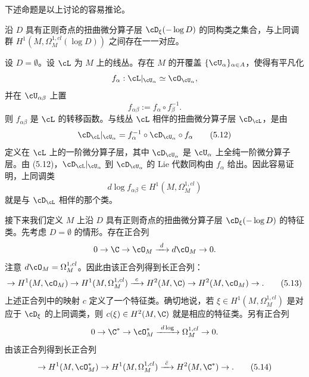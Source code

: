 下述命题是以上讨论的容易推论。

\begin{proposition}[5.9]
 沿 $D$ 具有正则奇点的扭曲微分算子层 $\cD_\xi(-\log D)$ 的同构类之集合，与上同调群 $H^1(M,\Omega^{1,cl}_M(\log D))$ 之间存在一一对应。
\end{proposition}


\begin{example}[5.10]
 设 $D=\emptyset$。设 $\cL$ 为 $M$ 上的线丛。存在 $M$ 的开覆盖 $\{\cU_\alpha\}_{\alpha\in A}$，使得有平凡化
 \[
  f_\alpha:\cL|_{\cU_\alpha}\simeq\cO_{\cU_\alpha},
 \]
 并在 $\cU_{\alpha\beta}$ 上置
 \[
  f_{\alpha\beta}:=f_\alpha\circ f_\beta^{-1}.
 \]
 则 $f_{\alpha\beta}$ 是 $\cL$ 的转移函数。与线丛 $\cL$ 相伴的扭曲微分算子层 $\cD_\cL$，是由
 \begin{equation}
  \cD_\cL|_{\cU_\alpha}=f_\alpha^{-1}\circ\cD_{\cU_\alpha}\circ f_\alpha \tag{5.12}
 \end{equation}
 定义在 $\cL$ 上的一阶微分算子层，其中 $\cD_{\cU_\alpha}$ 是 $\cU_\alpha$ 上全纯一阶微分算子层。由 (5.12)，$\cD_\cL|_{\cU_\alpha}$ 到 $\cD_{\cU_\alpha}$ 的 Lie 代数同构由 $f_\alpha$ 给出。因此容易证明，上同调类
 \[
  d\log f_{\alpha\beta}\in H^1(M,\Omega^{1,cl}_M)
 \]
 就是与 $\cD_\cL$ 相伴的那个类。
\end{example}


接下来我们定义 $M$ 上沿 $D$ 具有正则奇点的扭曲微分算子层 $\cD_\xi(-\log D)$ 的特征类。先考虑 $D=\emptyset$ 的情形。存在正合列
\[
 0\to\C\to\cO_M\xrightarrow{\ d\ }d\cO_M\to0.
\]
注意 $d\cO_M=\Omega^{1,cl}_M$。因此由该正合列得到长正合列：
\begin{equation}
 \to H^1(M,\cO_M)\to H^1(M,\Omega^{1,cl}_M)\xrightarrow{\ c\ }H^2(M,\C)
 \to H^2(M,\cO_M)\to. \tag{5.13}
\end{equation}
上述正合列中的映射 $c$ 定义了一个特征类。确切地说，若 $\xi\in H^1(M,\Omega^{1,cl}_M)$ 是对应于 $\cD_\xi$ 的上同调类，则 $c(\xi)\in H^2(M,\C)$ 就是相应的特征类。另有正合列
\[
 0\to\C^*\to\cO^*_M\xrightarrow{\ d\log\ }\Omega^{1,cl}_M\to0.
\]
由该正合列得到长正合列
\begin{equation}
 \to H^1(M,\cO^*_M)\to H^1(M,\Omega^{1,cl}_M)\xrightarrow{\ \bar c\ }H^2(M,\C^*)\to. \tag{5.14}
\end{equation}

